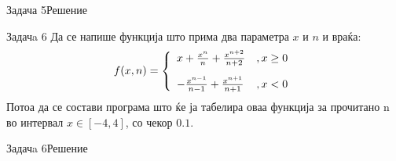 \begin{frame}[fragile]{Задача 5}{Решение}
   
\end{frame}

\begin{frame}{Задачa 6}
Да се напише функција што прима два параметра $x$ и $n$ и враќа:
\[
   f(x, n) = \left\{ 
  \begin{array}{l l}
    x + \frac{x^n}{n} + \frac{x^{n+2}}{n + 2} &,x\geq0\\[10px]
    - \frac{x^{n - 1}}{n - 1} + \frac{x^{n+1}}{n + 1} &,x<0
  \end{array} \right.
\]
Потоа да се состави програма што ќе ја табелира оваа функција за прочитано n во
интервал $x\in[-4, 4]$, со чекор $0.1$.
\end{frame}

\begin{frame}[fragile]{Задачa 6}{Решение}
\begin{columns}
          
        
\end{columns}
\end{frame}

